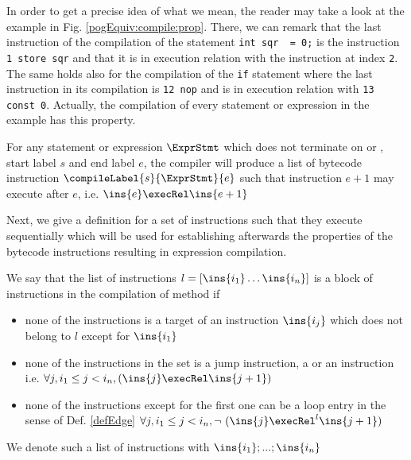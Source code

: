 In order to get a precise idea of what we mean, the reader may take a look at the example in Fig. \ref{pogEquiv:compile:prop}.
There, we can remark that the last instruction of the compilation of the statement \lstinline!int sqr  = 0;! is the instruction \lstinline!1 store sqr! 
and that it is in execution relation with the instruction at index \lstinline!2!. The same holds also for the compilation of the \lstinline!if!
statement where the last instruction  in its compilation is \lstinline!12 nop! and is  in execution relation with \lstinline!13 const 0!.
Actually, the compilation of every statement or expression in the example has this property.

\begin{compProp}\label{compile:prop:compProp0}
 For any statement or expression $\ExprStmt$ which does not terminate on \return or \athrow, start label $s$ and end label $e$,
    the compiler will produce a list of bytecode instruction $\compileLabel{s}{\ExprStmt}{e}$ such that  instruction  $e+1$ may execute after
    $e$, i.e.   $ \ins{e} \execRel \ins{e+1}$
\end{compProp}





 


Next, we give a definition for a set of instructions such that they execute sequentially which will be used for 
establishing afterwards the properties of the bytecode instructions resulting in expression compilation.
 
\begin{seqInstr} \label{seqInstr}
We say that the list of instructions  $l  = \lbrack \ins{i_1} \ldots \ins{i_n} \rbrack$ is a block of instructions
 in the compilation of method \methodd{} if 
 \begin{itemize}
      \item none of the instructions is a target of an instruction $\ins{i_j}$ which does not belong to $l$ except for $\ins{i_1}$
      \item none of the instructions in the set is a jump instruction, a \return{} or an \athrow{} instruction
            i.e. %
                $  \forall j, i_1 \le  j < i_n ,   ( \ins{j} \execRel \ins{j + 1} ) $ 
      \item none of the instructions except for the first one can be a loop entry in the sense of Def. \ref{defEdge}
             $  \forall j, i_1 \le  j < i_n , \neg  \ ( \ins{j} \execRel^{l} \ins{j + 1} ) $ 
 \end{itemize}

We denote such a list of instructions with $\ins{i_1};...;\ins{i_n}$

\end{seqInstr}


